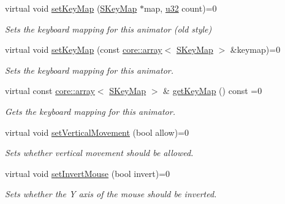 \begin{DoxyCompactItemize}
virtual void \hyperlink{classirr_1_1scene_1_1ISceneNodeAnimatorCameraFPS_a449aba2c0047f895e417a872505c02ce}{set\+Key\+Map} (\hyperlink{structirr_1_1SKeyMap}{S\+Key\+Map} $\ast$map, \hyperlink{namespaceirr_a0416a53257075833e7002efd0a18e804}{u32} count)=0
\begin{DoxyCompactList}\small\item\em Sets the keyboard mapping for this animator (old style) \end{DoxyCompactList}\item 
virtual void \hyperlink{classirr_1_1scene_1_1ISceneNodeAnimatorCameraFPS_a9a76aeafb9fe79a13b7b128b3eb3b103}{set\+Key\+Map} (const \hyperlink{classirr_1_1core_1_1array}{core\+::array}$<$ \hyperlink{structirr_1_1SKeyMap}{S\+Key\+Map} $>$ \&keymap)=0
\begin{DoxyCompactList}\small\item\em Sets the keyboard mapping for this animator. \end{DoxyCompactList}\item 
\mbox{\label{classirr_1_1scene_1_1ISceneNodeAnimatorCameraFPS_aa3b428a56758529574a14f5d480c2bb7}} 
virtual const \hyperlink{classirr_1_1core_1_1array}{core\+::array}$<$ \hyperlink{structirr_1_1SKeyMap}{S\+Key\+Map} $>$ \& \hyperlink{classirr_1_1scene_1_1ISceneNodeAnimatorCameraFPS_aa3b428a56758529574a14f5d480c2bb7}{get\+Key\+Map} () const =0
\begin{DoxyCompactList}\small\item\em Gets the keyboard mapping for this animator. \end{DoxyCompactList}\item 
virtual void \hyperlink{classirr_1_1scene_1_1ISceneNodeAnimatorCameraFPS_a56cd5340472cc22e08ff17217af8af89}{set\+Vertical\+Movement} (bool allow)=0
\begin{DoxyCompactList}\small\item\em Sets whether vertical movement should be allowed. \end{DoxyCompactList}\item 
virtual void \hyperlink{classirr_1_1scene_1_1ISceneNodeAnimatorCameraFPS_abe634d0c7b03cc6f5adb9df3f04bacd5}{set\+Invert\+Mouse} (bool invert)=0
\begin{DoxyCompactList}\small\item\em Sets whether the Y axis of the mouse should be inverted. \end{DoxyCompactList}\item 

\end{DoxyCompactItemize}
